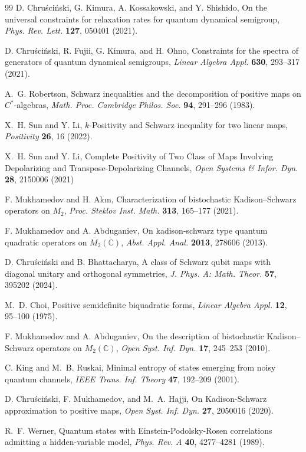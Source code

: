 \documentclass[11pt,reqno]{amsart}
\theoremstyle{definition}
\numberwithin{equation}{section} \setcounter{tocdepth}{1}
\numberwithin{equation}{section}
\begin{document}
\begin{thebibliography}{99}
D. Chru\'sci\'nski, G. Kimura, A. Kossakowski, and Y. Shishido,
On the universal constraints for relaxation rates for quantum dynamical semigroup,
\emph{Phys. Rev. Lett.} \textbf{127}, 050401 (2021).

D. Chru\'sci\'nski, R. Fujii, G. Kimura, and H. Ohno,
Constraints for the spectra of generators of quantum dynamical semigroups,
\emph{Linear Algebra Appl.} \textbf{630}, 293–317 (2021).

A.~G. Robertson,
Schwarz inequalities and the decomposition of positive maps on $C^*$-algebras,
\emph{Math. Proc. Cambridge Philos. Soc.} \textbf{94}, 291–296 (1983).

X.~H. Sun and Y. Li,
$k$-Positivity and Schwarz inequality for two linear maps,
\emph{Positivity} \textbf{26}, 16 (2022).

X.~H. Sun and Y. Li,
Complete Positivity of Two Class of Maps Involving Depolarizing and Transpose-Depolarizing Channels,
\emph{Open Systems \& Infor. Dyn.} \textbf{28}, 2150006 (2021)

F. Mukhamedov and H. Akın,
Characterization of bistochastic Kadison–Schwarz operators on $M_2$,
\emph{Proc. Steklov Inst. Math.} \textbf{313}, 165–177 (2021).

F. Mukhamedov and A. Abduganiev,
On kadison-schwarz type quantum quadratic operators on $M_2(\mathbb{C})$,
\emph{Abst. Appl. Anal. } \textbf{2013}, 278606 (2013).

D. Chru\'sci\'nski and B. Bhattacharya,
A class of Schwarz qubit maps with diagonal unitary and orthogonal symmetries,
\emph{J. Phys. A: Math. Theor.} \textbf{57}, 395202 (2024).

M.~D. Choi,
Positive semidefinite biquadratic forms,
\emph{Linear Algebra Appl.} \textbf{12}, 95–100 (1975).

F. Mukhamedov and A. Abduganiev,
On the description of bistochastic Kadison–Schwarz operators on $M_2(\mathbb{C})$,
\emph{Open Syst. Inf. Dyn.} \textbf{17}, 245–253 (2010).

C. King and M.~B. Ruskai,
Minimal entropy of states emerging from noisy quantum channels,
\emph{IEEE Trans. Inf. Theory} \textbf{47}, 192–209 (2001).

D. Chru\'sci\'nski, F. Mukhamedov, and M.~A. Hajji,
On Kadison-Schwarz approximation to positive maps,
\emph{Open Syst. Inf. Dyn.} \textbf{27}, 2050016 (2020).

R.~F. Werner,
Quantum states with Einstein-Podolsky-Rosen correlations admitting a hidden-variable model,
\emph{Phys. Rev. A} \textbf{40}, 4277–4281 (1989).

\end{thebibliography}
\end{document}

